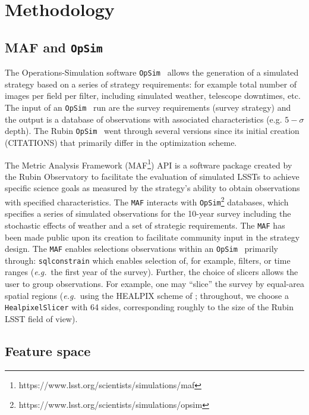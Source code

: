 \documentclass[onecolumn, 10pt]{aastex63}
\newcommand{\eg}{\emph{e.g.}}
\newcommand{\opsim}{\texttt{OpSim}}
\begin{document}

\section{Methodology} \label{method}

\subsection{MAF and \opsim~}\label{sec:MAF}
The Operations-Simulation software \opsim~ allows the generation of a simulated strategy based on a series of strategy requirements: for example total number of images per field per filter, including simulated weather, telescope downtimes, etc. The input of an \opsim~ run are the survey requirements (survey strategy) and the output is a database of observations with associated characteristics (e.g. $5-\sigma$ depth). The Rubin \opsim~ went through several versions since its initial creation (CITATIONS) that primarily differ in the optimization scheme. 

The Metric Analysis Framework (MAF\footnote{https://www.lsst.org/scientists/simulations/maf}) API is a software package created by the Rubin Observatory \citep{maf} to facilitate the evaluation of simulated LSSTs to achieve specific science goals as measured by the strategy’s ability to obtain observations with specified characteristics. The \texttt{MAF} interacts with \opsim\footnote{https://www.lsst.org/scientists/simulations/opsim} databases, which specifies a series of simulated observations for the 10-year survey including the stochastic effects of weather and a set of strategic requirements. The \texttt{MAF} has been made public upon its creation to facilitate community input in the strategy design.
The \texttt{MAF} enables selections observations within an \opsim~ primarily through: \texttt{sqlconstrain} which enables selection of, for example, filters, or time ranges (\eg~the first year of the survey). Further, the choice of slicers allows the user to group observations. For example, one may ``slice'' the survey by equal-area spatial regions (\eg~using the HEALPIX scheme of \citealt{healpix2005}; throughout, we choose a \texttt{HealpixelSlicer} with 64 sides, corresponding roughly to the size of the Rubin LSST field of view).

\subsection{Feature space}
\end{document}
